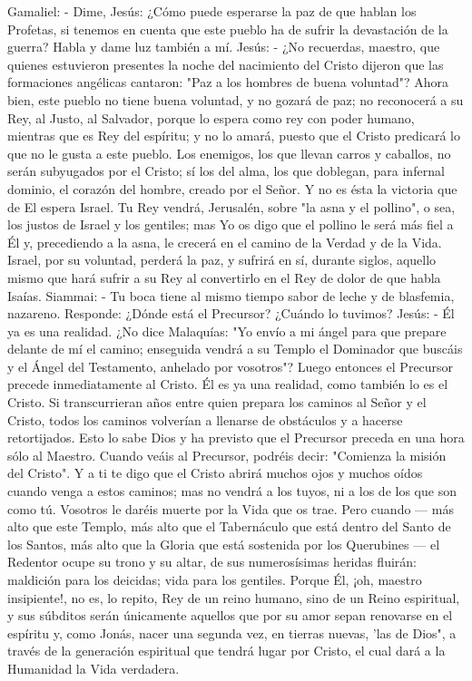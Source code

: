 \documentclass[12pt]{book} %
\begin{document}
Gamaliel: - Dime, Jesús: ¿Cómo puede esperarse la paz de que hablan los Profetas, si tenemos en cuenta que este 
pueblo ha de sufrir la devastación de la guerra? Habla y dame luz también a mí. 
Jesús: - ¿No recuerdas, maestro, que quienes estuvieron presentes la noche del nacimiento del Cristo dijeron que las formaciones angélicas cantaron: "Paz a los hombres de buena voluntad"? Ahora bien, este pueblo no tiene buena voluntad, y no gozará de paz; no reconocerá a su Rey, al Justo, al Salvador, porque lo espera como rey con poder humano, mientras que es Rey del espíritu; y no lo amará, puesto que el Cristo predicará lo que no le gusta a este pueblo. Los enemigos, los que llevan carros y caballos, no serán subyugados por el Cristo; sí los del alma, los que doblegan, para infernal dominio, el corazón del hombre, creado por el Señor. Y no es ésta la victoria que de El espera Israel. Tu Rey vendrá, Jerusalén, sobre "la asna y el pollino", o sea, los justos de Israel y los gentiles; mas Yo os digo que el pollino le será más fiel a Él y, precediendo a la asna, le crecerá en el camino de la Verdad y de la Vida. Israel, por su voluntad, perderá la paz, y sufrirá en sí, durante siglos, aquello mismo que hará sufrir a su Rey al convertirlo en el Rey de dolor de que habla Isaías.                       
Siammai: - Tu boca tiene al mismo tiempo sabor de leche y de blasfemia, nazareno. Responde: ¿Dónde está el Precursor? ¿Cuándo lo tuvimos? 
Jesús: - Él ya es una realidad. ¿No dice Malaquías: "Yo envío a mi ángel para que prepare delante de mí el camino; enseguida vendrá a su Templo el Dominador que buscáis y el Ángel del Testamento, anhelado por vosotros"? Luego entonces el Precursor precede inmediatamente al Cristo. Él es ya una realidad, como también lo es el Cristo. Si transcurrieran años entre quien prepara los caminos al Señor y el Cristo, todos los caminos volverían a llenarse de obstáculos y a hacerse retortijados. Esto lo sabe Dios y ha previsto que el Precursor preceda en una hora sólo al Maestro. Cuando veáis al Precursor, podréis decir: "Comienza la misión del Cristo". Y a ti te digo que el Cristo abrirá muchos ojos y muchos oídos cuando venga a estos caminos; mas no vendrá a los tuyos, ni a los de los que son como tú. Vosotros le daréis muerte por la Vida que os trae. Pero cuando — más alto que este Templo, más alto que el Tabernáculo que está dentro del Santo de los Santos, más alto que la Gloria que está sostenida por los Querubines — el Redentor ocupe su trono y su altar, de sus numerosísimas heridas fluirán: maldición para los deicidas; vida para los gentiles. Porque Él, ¡oh, maestro insipiente!, no es, lo repito, Rey de un reino humano, sino de un Reino espiritual, y sus súbditos serán únicamente aquellos que por su amor sepan renovarse en el espíritu y, como Jonás, nacer una segunda vez, en tierras nuevas, 'las de Dios", a través de la generación espiritual que tendrá lugar por Cristo, el cual dará a la Humanidad la Vida verdadera. 
\end{document}
